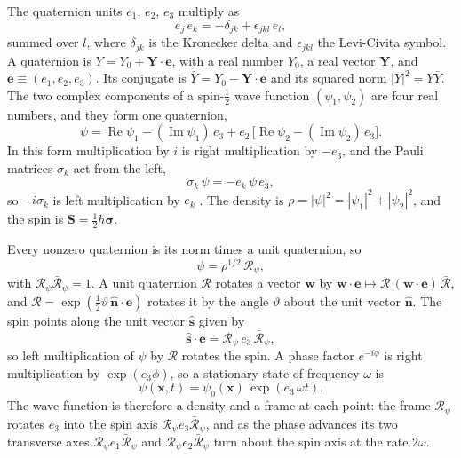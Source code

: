 \documentclass[aps,prd,onecolumn,tightenlines,nofootinbib,notitlepage,11pt,floatfix]{revtex4-2}
\theoremstyle{indentedtheorem}
\begin{document}
The quaternion units $e_1$, $e_2$, $e_3$ multiply as
\begin{equation}
    e_j\,e_k = -\delta_{jk} + \epsilon_{jkl}\,e_l ,
    \label{eq:quaternion_units}
\end{equation}
summed over $l$, where $\delta_{jk}$ is the Kronecker delta and $\epsilon_{jkl}$ the Levi-Civita symbol. A quaternion is $Y=Y_0+\mathbf{Y}\cdot\mathbf{e}$, with a real number $Y_0$, a real vector $\mathbf{Y}$, and $\mathbf{e}\equiv(e_1,e_2,e_3)$. Its conjugate is $\bar{Y}=Y_0-\mathbf{Y}\cdot\mathbf{e}$ and its squared norm $|Y|^2=Y\bar{Y}$. The two complex components of a spin-$\tfrac{1}{2}$ wave function $(\psi_1,\psi_2)$ are four real numbers, and they form one quaternion,
\begin{equation}
    \psi = \operatorname{Re}\psi_1 - (\operatorname{Im}\psi_1)\,e_3 + e_2\,\big[\operatorname{Re}\psi_2 - (\operatorname{Im}\psi_2)\,e_3\big] .
    \label{eq:spinor_quaternion}
\end{equation}
In this form multiplication by $i$ is right multiplication by $-e_3$, and the Pauli matrices $\sigma_k$ act from the left,
\begin{equation}
    \sigma_k\,\psi = -e_k\,\psi\,e_3 ,
    \label{eq:pauli_quaternion}
\end{equation}
so $-i\sigma_k$ is left multiplication by $e_k$ \citep{HutchisonWavefn2026}. The density is $\rho=|\psi|^2=|\psi_1|^2+|\psi_2|^2$, and the spin is $\mathbf{S}=\tfrac{1}{2}\hbar\boldsymbol{\sigma}$.

Every nonzero quaternion is its norm times a unit quaternion, so
\begin{equation}
    \psi = \rho^{1/2}\,\mathcal{R}_\psi ,
    \label{eq:polar_form}
\end{equation}
with $\mathcal{R}_\psi\bar{\mathcal{R}}_\psi=1$. A unit quaternion $\mathcal{R}$ rotates a vector $\mathbf{w}$ by $\mathbf{w}\cdot\mathbf{e}\mapsto\mathcal{R}\,(\mathbf{w}\cdot\mathbf{e})\,\bar{\mathcal{R}}$, and $\mathcal{R}=\exp(\tfrac{1}{2}\vartheta\,\hat{\mathbf{n}}\cdot\mathbf{e})$ rotates it by the angle $\vartheta$ about the unit vector $\hat{\mathbf{n}}$. The spin points along the unit vector $\hat{\mathbf{s}}$ given by
\begin{equation}
    \hat{\mathbf{s}}\cdot\mathbf{e} = \mathcal{R}_\psi\,e_3\,\bar{\mathcal{R}}_\psi ,
    \label{eq:spin_rotor}
\end{equation}
so left multiplication of $\psi$ by $\mathcal{R}$ rotates the spin. A phase factor $e^{-i\phi}$ is right multiplication by $\exp(e_3\phi)$, so a stationary state of frequency $\omega$ is
\begin{equation}
    \psi(\mathbf{x},t) = \psi_0(\mathbf{x})\,\exp(e_3\,\omega t) .
    \label{eq:stationary_time}
\end{equation}
The wave function is therefore a density and a frame at each point: the frame $\mathcal{R}_\psi$ rotates $e_3$ into the spin axis $\mathcal{R}_\psi e_3\bar{\mathcal{R}}_\psi$, and as the phase advances its two transverse axes $\mathcal{R}_\psi e_1\bar{\mathcal{R}}_\psi$ and $\mathcal{R}_\psi e_2\bar{\mathcal{R}}_\psi$ turn about the spin axis at the rate $2\omega$.
\end{document}
